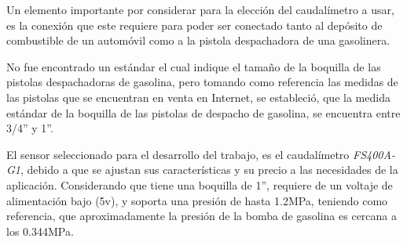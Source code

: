 Un elemento importante por considerar para la elección del caudalímetro a usar, es la conexión que este requiere para poder ser conectado tanto al depósito de combustible de un automóvil como a la pistola despachadora de una gasolinera.

No fue encontrado un estándar el cual indique el tamaño de la boquilla de las pistolas despachadoras de gasolina, pero tomando como referencia las medidas de las pistolas que se encuentran en venta en Internet\cite{PISTOLAS}, se estableció, que la medida estándar de la boquilla de las pistolas de despacho de gasolina, se encuentra entre 3/4'' y 1''.

El sensor seleccionado para el desarrollo del trabajo, es el caudalímetro \textit{FS400A-G1}, debido a que se ajustan sus características y su precio a las necesidades de la aplicación. Considerando que tiene una boquilla de 1'', requiere de un voltaje de alimentación bajo (5v), y soporta una presión de hasta 1.2MPa, teniendo como referencia, que aproximadamente la presión de la bomba de gasolina es cercana a los 0.344MPa\cite{PISTOLA}.

